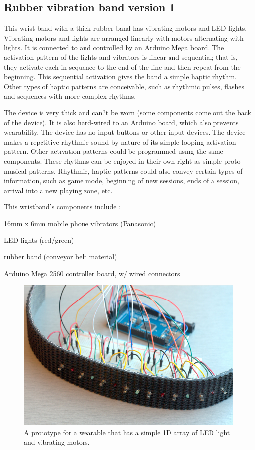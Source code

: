 \documentclass{chi-ext}
\begin{document}
\subsection{Rubber vibration band version 1}
This wrist band with a thick rubber band has vibrating motors and LED lights. Vibrating motors and lights are arranged linearly with motors alternating with lights. It is connected to and controlled by an Arduino Mega board. The activation pattern of the lights and vibrators is linear and sequential; that is, they activate each in sequence to the end of the line and then repeat from the beginning. This sequential activation gives the band a simple haptic rhythm. Other types of haptic patterns are conceivable, such as rhythmic pulses, flashes and sequences with more complex rhythms. 

The device is very thick and can?t be worn (some components come out the back of the device). It is also hard-wired to an Arduino board, which also prevents wearability. The device has no input buttons or other input devices. The device makes a repetitive rhythmic sound by nature of its simple looping activation pattern. Other activation patterns could be programmed using the same components. These rhythms can be enjoyed in their own right as simple proto-musical patterns. Rhythmic, haptic patterns could also convey certain types of information, such as game mode, beginning of new sessions, ends of a session, arrival into a new playing zone, etc. 

This wristband's components include	:
\begin{inparaenum}
\item 16mm x 6mm mobile phone vibrators (Panasonic)
\item LED lights (red/green)
\item rubber band (conveyor belt material)
\item Arduino Mega 2560 controller board, w/ wired connectors
\end{inparaenum}

\begin{figure}
  \begin{center}
  \includegraphics[width=\columnwidth]{images/P1130394.jpg}
  \caption{A prototype for a wearable that has a simple 1D array of LED light and vibrating motors.}
  \label{fig:marginparsample}
  \end{center}  
\end{figure}
\end{document}
